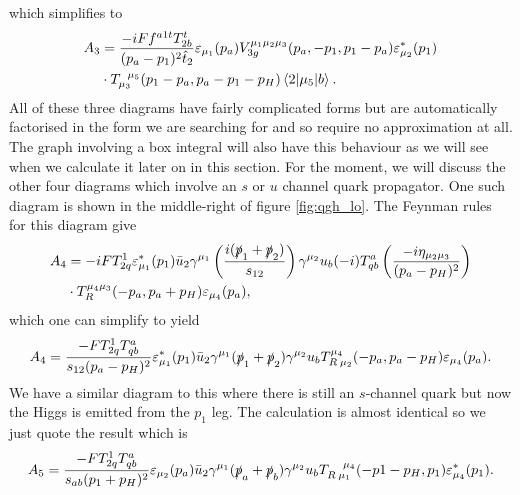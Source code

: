which simplifies to
\begin{equation}
\begin{split}
A_3 &= \frac{-iF f^{a1t}T^t_{2b}}{(p_a-p_1)^2 \hat{t}_2} \varepsilon_{\mu_1}(p_a)V_{3g}^{\mu_1 \mu_2 \mu_3}(p_a, -p_1, p_1 - p_a)  \varepsilon_{\mu_2}^*(p_1)\\
& \cdot T_{\mu_3}^{\hspace{5pt}\mu_5}(p_1-p_a,p_a-p_1-p_H) \mathinner{\langle2\vert\mu_5\vert b\rangle}_{}.
\end{split}
\end{equation}
All of these three diagrams have fairly complicated forms but are automatically factorised in the form we are searching for and so require no approximation at all. The graph involving a box integral will also have this behaviour as we will see when we calculate it later on in this section. For the moment, we will discuss the other four diagrams which involve an $s$ or $u$ channel quark propagator. One such diagram is shown in the middle-right of figure \ref{fig:qgh_lo}. The Feynman rules for this diagram give
\begin{equation}
\begin{split}
A_4 &= -i FT^{1}_{2q} \varepsilon_{\mu_1}^*(p_1) \bar{u}_2 \gamma^{\mu_1}  \left(\frac{i(\slashed{p}_1+\slashed{p}_2)}{s_{12}}\right) \gamma^{\mu_2}u_b (-i)T^{a}_{qb} \left(\frac{-i \eta_{\mu_2 \mu_3}}{(p_a-p_H)^2} \right)\\
&\cdot T_R^{\mu_4 \mu_3}(-p_a,p_a+p_H)\varepsilon_{\mu_4}(p_a),
\end{split}
\end{equation}
which one can simplify to yield
\begin{equation}
A_4 = \frac{- F T^1_{2q}T^a_{qb}}{s_{12}(p_a-p_H)^2} \varepsilon^*_{\mu_1}(p_1) \bar{u}_2 \gamma^{\mu_1}(\slashed{p}_1+\slashed{p}_2)\gamma^{\mu_2}u_b T_{R \hspace{2pt} \mu_2}^{\mu_4}(-p_a,p_a-p_H)\varepsilon_{\mu_4}(p_a).
\end{equation}
We have a similar diagram to this where there is still an $s$-channel quark but now the Higgs is emitted from the $p_1$ leg. The calculation is almost identical so we just quote the result which is
\begin{equation}
A_5 = \frac{- F T^1_{2q}T^a_{qb}}{s_{ab}(p_1+p_H)^2} \varepsilon_{\mu_2}(p_a) \bar{u}_2 \gamma^{\mu_1}(\slashed{p}_a+\slashed{p}_b)\gamma^{\mu_2}u_b T_{R \hspace{2pt}  \mu_1}^{\hspace{10pt} \mu_4}(-p1-p_H,p_1)\varepsilon_{\mu_4}^*(p_1).
\end{equation}
